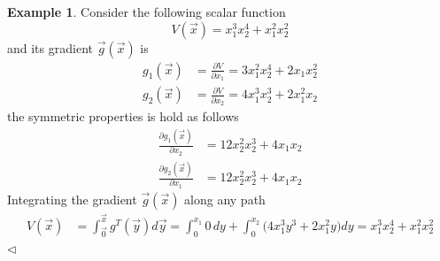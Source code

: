 \documentclass[11pt,a4paper,oneside]{book}
\numberwithin{equation}{section}
\theoremstyle{it}
\theoremstyle{definition}
\newtheorem{example}{Example}[chapter]
\begin{document}
\begin{example}
	Consider the following scalar function
	\begin{equation*}
		V(\vec{x})=x_1^3x_2^4+x_1^2x_2^2
	\end{equation*} 
	and its gradient $\vec{g}(\vec{x})$ is
	\begin{equation*}
		\begin{aligned}
			g_1(\vec{x}) &= \frac{\partial V}{\partial x_1} = 
			3x_1^2x_2^4+2x_1x_2^2 \\[8pt] 
			g_2(\vec{x}) &= \frac{\partial V}{\partial x_2} = 
			4x_1^3x_2^3+2x_1^2x_2
		\end{aligned}
	\end{equation*} 
	the symmetric properties is hold as follows 
	\begin{equation*}
		\begin{aligned}
			\frac{\partial g_1(\vec{x})}{\partial x_2} &= 12x_2^2x_2^3+4x_1x_2 
			\\[8pt] 
			\frac{\partial g_2(\vec{x})}{\partial x_1} &= 12x_2^2x_2^3+4x_1x_2
		\end{aligned}
	\end{equation*} 
	Integrating the gradient $\vec{g}(\vec{x})$ along any path 
	\begin{equation*}
		\begin{aligned}
			V(\vec{x})&=\int_{\vec{0}}^{\vec{x}}g^T(\vec{y})d\vec{y} = 
			\int_{0}^{x_1}0\,dy+\int_{0}^{x_2}\Big(4x_1^3y^3+2x_1^2y\Big)dy=x_1^3x_2^4+x_1^2x_2^2
		\end{aligned}
	\end{equation*}
	$\triangleleft$
\end{example}
\end{document}
